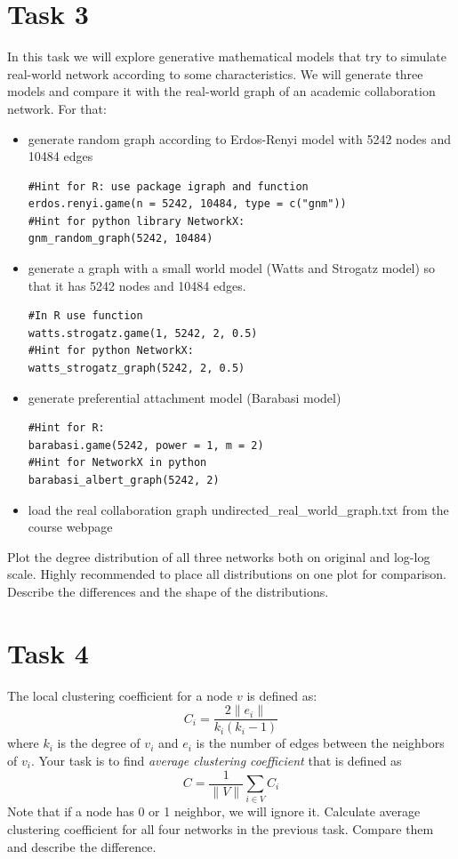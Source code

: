 \documentclass{article}
\begin{document}
\section*{Task 3}
In this task we will explore generative mathematical models that try to simulate real-world network according to some characteristics. We will generate three models and compare it with the real-world graph of an academic collaboration network. For that:
\begin{itemize}
\item generate random graph according to Erdos-Renyi model with 5242 nodes and 10484 edges 
\begin{lstlisting}
#Hint for R: use package igraph and function 
erdos.renyi.game(n = 5242, 10484, type = c("gnm"))
#Hint for python library NetworkX: 
gnm_random_graph(5242, 10484)
\end{lstlisting}
\item generate a graph with a small world model (Watts and Strogatz model) so that it has 5242 nodes and 10484 edges. 
\begin{lstlisting}
#In R use function
watts.strogatz.game(1, 5242, 2, 0.5)
#Hint for python NetworkX: 
watts_strogatz_graph(5242, 2, 0.5)
\end{lstlisting}
\item generate preferential attachment model (Barabasi model)
\begin{lstlisting}
#Hint for R: 
barabasi.game(5242, power = 1, m = 2)
#Hint for NetworkX in python 
barabasi_albert_graph(5242, 2)
\end{lstlisting}
\item  load the real collaboration graph undirected\_real\_world\_graph.txt from the course webpage
\end{itemize}
Plot the degree distribution of all three networks both on original and log-log scale. Highly recommended to place all distributions on one plot for comparison. Describe the differences and the shape of the distributions.
 
\section*{Task 4}
The local clustering coefficient for a node $v$ is defined as:
$$C_i = \frac{2\|e_i\|}{k_i(k_i-1)}$$
where $k_i$ is the degree of $v_i$ and $e_i$ is the number of edges between the neighbors of $v_i$. Your task is to find \emph{average clustering coefficient} that is defined as 
$$C = \frac{1}{\|V\|}\sum_{i\in V}C_i$$
Note that if a node has 0 or 1 neighbor, we will ignore it.
Calculate average clustering coefficient for all four networks in the previous task. Compare them and describe the difference. 
\end{document}
